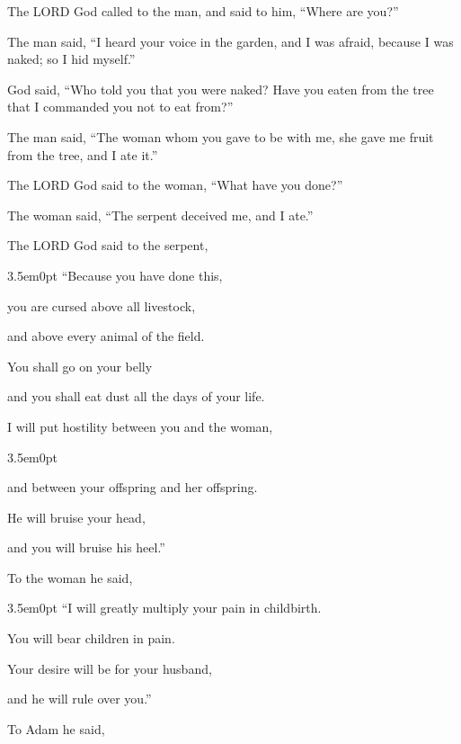\myverse{}The LORD God called to the man, and said to him, “Where are you?”

\myverse{}The man said, “I heard your voice in the garden, and I was afraid, because I was naked; so I hid myself.”

\myverse{}God said, “Who told you that you were naked? Have you eaten from the tree that I commanded you not to eat from?”

\myverse{}The man said, “The woman whom you gave to be with me, she gave me fruit from the tree, and I ate it.”

\myverse{}The LORD God said to the woman, “What have you done?”

The woman said, “The serpent deceived me, and I ate.”

\myverse{}The LORD God said to the serpent,

\begin{adjustwidth}{3.5em}{0pt}
	“Because you have done this,
	
	you are cursed above all livestock,
	
	and above every animal of the field.
	
	You shall go on your belly
	
	and you shall eat dust all the days of your life.
\end{adjustwidth}

\myverse{}I will put hostility between you and the woman,

\begin{adjustwidth}{3.5em}{0pt}
	
	and between your offspring and her offspring.
	
	He will bruise your head,
	
	and you will bruise his heel.”
\end{adjustwidth}

\myverse{}To the woman he said,

\begin{adjustwidth}{3.5em}{0pt}
	“I will greatly multiply your pain in childbirth.
	
	You will bear children in pain.
	
	Your desire will be for your husband,
	
	and he will rule over you.”
\end{adjustwidth}

\myverse{}To Adam he said,


